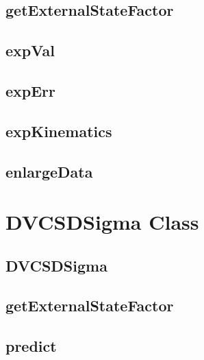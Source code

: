 \documentclass{book}
\begin{document}
\section{getExternalStateFactor}

\section{expVal}

\section{expErr}

\section{expKinematics}

\section{enlargeData}

\chapter{DVCSDSigma Class}

\section{DVCSDSigma}

\section{getExternalStateFactor}

\section{predict}
\end{document}
